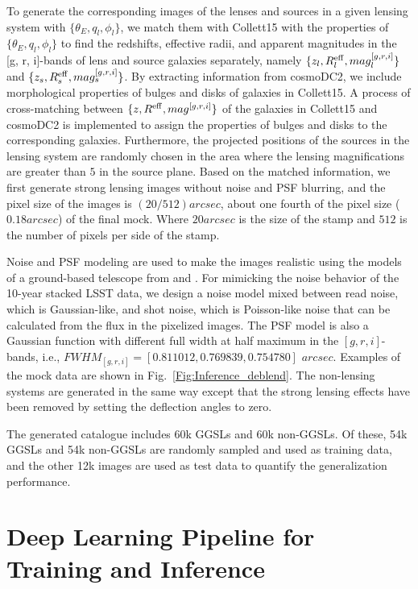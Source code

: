 \documentclass[12pt, twocolumn, apj]{openjournal}
\begin{document}
To generate the corresponding images of the lenses and sources in a given lensing system with $\{{\theta_E, q_l, \phi_l}\}$, we match them with Collett15 with the properties of $\{{\theta_E, q_l, \phi_l}\}$ to find the redshifts, effective radii, and apparent magnitudes in the [g, r, i]-bands of lens and source galaxies separately, namely $\{z_l, R^{\rm eff}_l, mag^{[g,r,i]}_l\}$ and $\{z_s, R^{\rm eff}_s,  mag^{[g,r,i]}_s\}$. By extracting information from cosmoDC2, we include morphological properties of bulges and disks of galaxies in Collett15. A process of cross-matching between $\{z, R^{\rm eff}, mag^{[g,r,i]}\}$ of the galaxies in Collett15 and cosmoDC2 is implemented to assign the properties of bulges and disks to the corresponding galaxies. Furthermore, the projected positions of the sources in the lensing system are randomly chosen in the area where the lensing magnifications are greater than $5$ in the source plane. Based on the matched information, we first generate strong lensing images without noise and PSF blurring, and the pixel size of the images is $(20/512) arcsec$, about one fourth of the pixel size ($0.18 arcsec$) of the final mock. Where $20 arcsec$ is the size of the stamp and $512$ is the number of pixels per side of the stamp.

Noise and PSF modeling are used to make the images realistic using the models of a ground-based telescope from \cite{Collett2015} and \cite{Connolly2010}. For mimicking the noise behavior of the 10-year stacked LSST data, we design a noise model mixed between read noise, which is Gaussian-like, and shot noise, which is Poisson-like noise that can be calculated from the flux in the pixelized images. The PSF model is also a Gaussian function with different full width at half maximum in the $[g,r,i]$-bands, i.e., $FWHM_{[g,r,i]} = [0.811012, 0.769839, 0.754780]\,\,arcsec$. Examples of the mock data are shown in Fig.~\ref{Fig:Inference_deblend}. 
The non-lensing systems are generated in the same way except that the strong lensing effects have been removed by setting the deflection angles to zero. 

The generated catalogue includes 60k GGSLs and 60k non-GGSLs. Of these, 54k GGSLs and 54k non-GGSLs are randomly sampled and used as training data, and the other 12k images are used as test data to quantify the generalization performance.


\section{Deep Learning Pipeline for Training and Inference}
\end{document}
